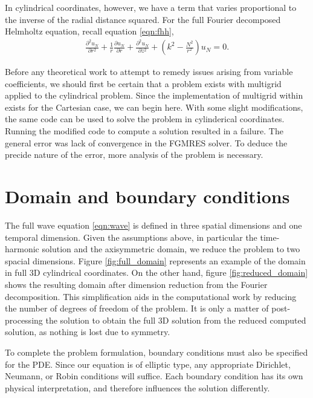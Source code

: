In cylindrical coordinates, however, we have a term that varies proportional to the inverse of the radial distance squared.
For the full Fourier decomposed Helmholtz equation, recall equation \eqref{eqn:fhh},
\begin{align}
	\frac{\partial^2 u_N}{\partial r^2}
			 + \frac{1}{r} \frac{\partial u_N}{\partial r}
			 + \frac{\partial^2 u_N}{\partial z^2}
			 + (k^2 - \frac{N^2}{r^2})u_N = 0. \label{eqn:full_fhh}
\end{align}

Before any theoretical work to attempt to remedy issues arising from variable coefficients, we should first be certain that a problem exists with multigrid applied to the cylindrical problem.
Since the implementation of multigrid within \oomph exists for the Cartesian case, we can begin here.
With some slight modifications, the same code can be used to solve the problem in cylinderical coordinates.
Running the modified code to compute a solution resulted in a failure.
The general error was lack of convergence in the FGMRES solver.
To deduce the precide nature of the error, more analysis of the problem is necessary.










\section{Domain and boundary conditions}

The full wave equation \eqref{eqn:wave} is defined in three spatial dimensions and one temporal dimension.
Given the assumptions above, in particular the time-harmonic solution and the axisymmetric domain, we reduce the problem to two spacial dimensions.
Figure \ref{fig:full_domain} represents an example of the domain in full 3D cylindrical coordinates.
On the other hand, figure \ref{fig:reduced_domain} shows the resulting domain after dimension reduction from the Fourier decomposition.
This simplification aids in the computational work by reducing the number of degrees of freedom of the problem.
It is only a matter of post-processing the solution to obtain the full 3D solution from the reduced computed solution, as nothing is lost due to symmetry.

To complete the problem formulation, boundary conditions must also be specified for the PDE.
Since our equation is of elliptic type, any appropriate Dirichlet, Neumann, or Robin conditions will suffice.
Each boundary condition has its own physical interpretation, and therefore influences the solution differently.

